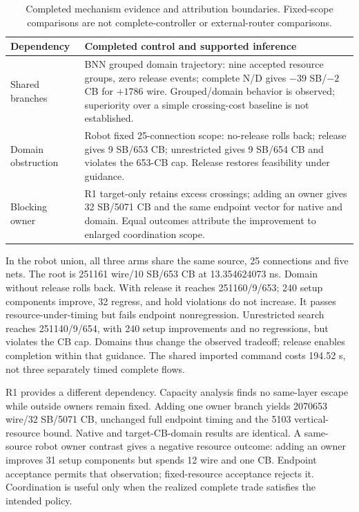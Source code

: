 \documentclass[conference,10pt]{IEEEtran}
\begin{document}
\begin{table}[t]
\centering\footnotesize\setlength{\tabcolsep}{3pt}
\caption{Completed mechanism evidence and attribution boundaries. Fixed-scope comparisons are not complete-controller or external-router comparisons.}
\label{tab:attribution}
\begin{tabular}{p{}p{}}\hline
Dependency & Completed control and supported inference\\\hline
Shared branches & BNN grouped domain trajectory: nine accepted resource groups, zero release events; complete N/D gives $-39$ SB/$-2$ CB for $+1786$ wire. Grouped/domain behavior is observed; superiority over a simple crossing-cost baseline is not established.\\
Domain obstruction & Robot fixed 25-connection scope: no-release rolls back; release gives 9 SB/653 CB; unrestricted gives 9 SB/654 CB and violates the 653-CB cap. Release restores feasibility under guidance.\\
Blocking owner & R1 target-only retains excess crossings; adding an owner gives 32 SB/5071 CB and the same endpoint vector for native and domain. Equal outcomes attribute the improvement to enlarged coordination scope.\\\hline
\end{tabular}
\end{table}

In the robot union, all three arms share the same source, 25 connections and five nets. The root is 251161 wire/10 SB/653 CB at 13.354624073 ns. Domain without release rolls back. With release it reaches 251160/9/653; 240 setup components improve, 32 regress, and hold violations do not increase. It passes resource-under-timing but fails endpoint nonregression. Unrestricted search reaches 251140/9/654, with 240 setup improvements and no regressions, but violates the CB cap. Domains thus change the observed tradeoff; release enables completion within that guidance. The shared imported command costs 194.52 s, not three separately timed complete flows.

R1 provides a different dependency. Capacity analysis finds no same-layer escape while outside owners remain fixed. Adding one owner branch yields 2070653 wire/32 SB/5071 CB, unchanged full endpoint timing and the 5103 vertical-resource bound. Native and target-CB-domain results are identical. A same-source robot owner contrast gives a negative resource outcome: adding an owner improves 31 setup components but spends 12 wire and one CB. Endpoint acceptance permits that observation; fixed-resource acceptance rejects it. Coordination is useful only when the realized complete trade satisfies the intended policy.
\end{document}
